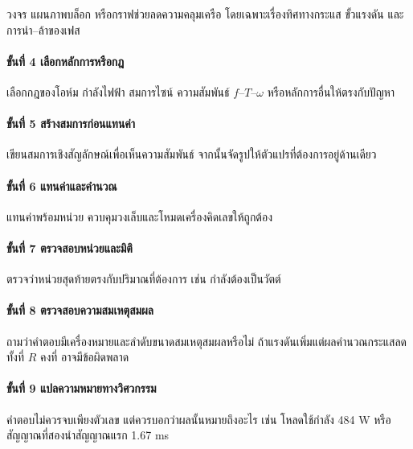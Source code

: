 วงจร แผนภาพบล็อก หรือกราฟช่วยลดความคลุมเครือ โดยเฉพาะเรื่องทิศทางกระแส ขั้วแรงดัน และการนำ–ล้าของเฟส

\paragraph{ขั้นที่ 4 เลือกหลักการหรือกฎ}

เลือกกฎของโอห์ม กำลังไฟฟ้า สมการไซน์ ความสัมพันธ์ $f$–$T$–$\omega$ หรือหลักการอื่นให้ตรงกับปัญหา

\paragraph{ขั้นที่ 5 สร้างสมการก่อนแทนค่า}

เขียนสมการเชิงสัญลักษณ์เพื่อเห็นความสัมพันธ์ จากนั้นจัดรูปให้ตัวแปรที่ต้องการอยู่ด้านเดียว

\paragraph{ขั้นที่ 6 แทนค่าและคำนวณ}

แทนค่าพร้อมหน่วย ควบคุมวงเล็บและโหมดเครื่องคิดเลขให้ถูกต้อง

\paragraph{ขั้นที่ 7 ตรวจสอบหน่วยและมิติ}

ตรวจว่าหน่วยสุดท้ายตรงกับปริมาณที่ต้องการ เช่น กำลังต้องเป็นวัตต์

\paragraph{ขั้นที่ 8 ตรวจสอบความสมเหตุสมผล}

ถามว่าคำตอบมีเครื่องหมายและลำดับขนาดสมเหตุสมผลหรือไม่ ถ้าแรงดันเพิ่มแต่ผลคำนวณกระแสลดทั้งที่ $R$ คงที่ อาจมีข้อผิดพลาด

\paragraph{ขั้นที่ 9 แปลความหมายทางวิศวกรรม}

คำตอบไม่ควรจบเพียงตัวเลข แต่ควรบอกว่าผลนั้นหมายถึงอะไร เช่น โหลดใช้กำลัง 484 W หรือสัญญาณที่สองนำสัญญาณแรก 1.67 ms

